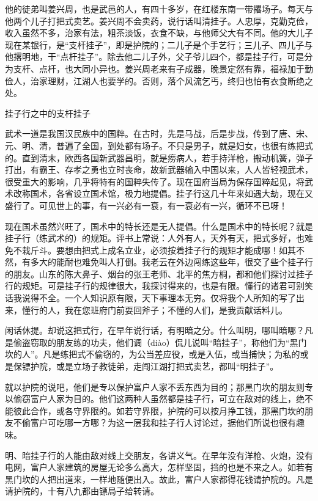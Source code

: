 \documentclass[12pt,UTF8]{ctexbook}
\begin{document}
他的徒弟叫姜兴周，也是武邑的人，有四十多岁，在红楼东南一带撂场子。每天与他两个儿子打把式卖艺。姜兴周不会卖药，说行话叫清挂子。人忠厚，克勤克俭，收入虽然不多，治家有法，粗茶淡饭，衣食不缺，与他师父大有不同。他的大儿子现在某银行，是“支杆挂子”，即是护院的；二儿子是个手艺行；三儿子、四儿子与他撂明地，干“点杆挂子”。除去他二儿子外，父子爷儿四个，都是挂子行，可是分为支杆、点杆，也大同小异也。姜兴周老来有子成器，晚景定然有靠，福禄加于勤俭人，治家理财，江湖人也要学的。否则，落个风流乞丐，终归也怕有衣食断绝之处。





挂子行之中的支杆挂子


武术一道是我国汉民族中的国粹。在古时，先是马战，后是步战，传到了唐、宋、元、明、清，普遍了全国，到处都有场子。不只是男子，就是妇女，也很有练把式的。直到清末，欧西各国新武器昌明，就是痨病人，若手持洋枪，搬动机簧，弹子打出，有霸王、存孝之勇也立时丧命，故新武器输入中国以来，人人皆轻视武术，很受重大的影响，几乎将特有的国粹失传了。现在国府当局为保存国粹起见，将武术改称国术，各省设立国术馆，极力地提倡。挂子行这几十年来如遇大劫，现在又盛行了。可见世上的事，有一兴必有一衰，有一衰必有一兴，循环不已呀！

现在国术虽然兴旺了，国术中的特长还是无人提倡。什么是国术中的特长呢？就是挂子行（练武术的）的规矩。评书上常说：人外有人，天外有天，把式多好，也难免不栽斤斗。要想由把式上成名立业，必须按着挂子行的规矩才能成哪！如其不然，有多大的能耐也难免叫人打倒。我老云在外边闯练这些年，很交了些个挂子行的朋友。山东的陈大鼻子、烟台的张王老师、北平的焦方桐，都和他们探讨过挂子行的规矩。可是挂子行的规律很大，我探讨得来的，也是有限。懂行的诸君可别笑话我说得不全。一个人知识原有限，天下事理本无穷。仅将我个人所知的写了出来，懂行的人，我在您班府门前耍回斧子；不懂的人们，是我贡献话料儿。

闲话休提。却说这把式行，在早年说行话，有明暗之分。什么叫明，哪叫暗哪？凡是偷盗窃取的朋友练的功夫，他们调（diào）侃儿说叫“暗挂子”，称他们为“黑门坎的人”。凡是练把式不偷窃的，为公当差应役，或是入伍，或当捕快；为私的或是保镖护院，或是立场子教徒弟，走闯江湖打把式卖艺，都叫“明挂子”。

就以护院的说吧，他们是专以保护富户人家不丢东西为目的；那黑门坎的朋友则专以偷窃富户人家为目的。他们这两种人虽然都是挂子行，可立在敌对的线上，绝不能彼此合作，或各守界限的。如若守界限，护院的可以按月挣工钱，那黑门坎的朋友不偷富户可吃哪一方哪？为这一层我和挂子行人讨论过，据他们所说也很有趣味。

明、暗挂子行的人能由敌对线上交朋友，各讲义气。在早年没有洋枪、火炮，没有电网，富户人家建筑的房屋无论多么高大，怎样坚固，挡的也是不来之人。如若有黑门坎的人把出道来，一样地随便出入。故此，富户人家都得花钱请护院的。凡是请护院的，十有八九都由镖局子给转请。
\end{document}
